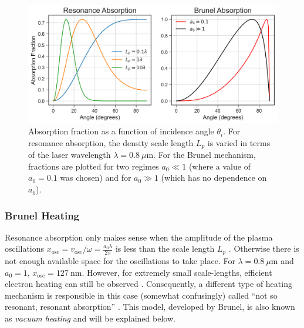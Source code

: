 \begin{figure}
	\centering 
	\includegraphics[width=\linewidth]{planning/images/absorption.png}
	\caption{Absorption fraction as a function of incidence angle $\theta_i$. For resonance absorption, the density scale length $L_p$ is varied in terms of the laser wavelength $\lambda = \SI{0.8}{\mu \meter}$. For the Brunel mechanism, fractions are plotted for two regimes $a_0 \ll 1$ (where a value of $a_0 = 0.1$ was chosen) and for $a_0 \gg 1$ (which has no dependence on $a_0$).}
	\label{fig:absorption}
\end{figure}

\subsubsection{Brunel Heating}
Resonance absorption only makes sense when the amplitude of the plasma oscillations $x_\text{osc} = v_\text{osc} / \omega = \frac{a_0 \lambda}{2 \pi}$ is less than the scale length $L_p$ \cite{Gibbon_2005_Plasma}. Otherwise there is not enough available space for the oscillations to take place. For $\lambda = \SI{0.8}{\mu \meter}$ and $a_0 = 1$, $x_\text{osc} = \SI{127}{\nano \meter}$. However, for extremely small scale-lengths, efficient electron heating can still be observed \cite{Grimes_1999_PRL}. Consequently, a different type of heating mechanism is responsible in this case (somewhat confusingly) called ``not so resonant, resonant absorption'' \cite{Brunel_1987_PRL}. This model, developed by Brunel, is also known as \emph{vacuum heating} and will be explained below. 

